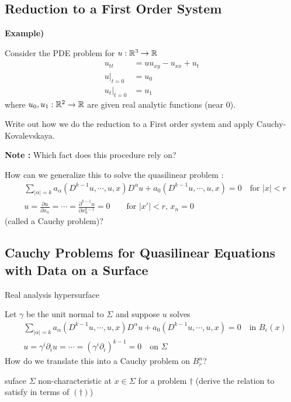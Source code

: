 \documentclass[10pt,a4paper]{report}
\newenvironment{proof}
{\begin{changemargin}{1cm}{0.5cm} 
	}%
	{\end{changemargin}
}
\begin{document}
\subsection*{Reduction to a First Order System}

\textbf{Example) }
\begin{proof}
\quad Consider the PDE problem for $u:\mathbb{R}^3 \rightarrow \mathbb{R}$
\begin{align}
u_{tt} &= uu_{xy} - u_{xx} + u_t  \label{11} \\
u\big|_{t=0}  &= u_0  \nonumber \\
u_t \big|_{t=0} &= u_1 \nonumber
\end{align}
where $u_0, u_1:\mathbb{R}^2 \rightarrow \mathbb{R}$ are given real analytic functions (near 0).

\quad Write out how we do the reduction to a First order system and apply Cauchy-Kovalevskaya.
\end{proof}
\s

\textbf{Note :} Which fact does this procedure rely on?
\s

How can we generalize this to solve the quasilinear problem :
\begin{align*}
& \sum_{|\alpha|=k} a_{\alpha} (D^{k-1}u,\cdots, u, x) D^{\alpha}u + a_0 (D^{k-1}u, \cdots, u,x) = 0 \quad \text{for } |x|<r \\
&  u = \frac{\partial u}{\partial x_n} =  \cdots = \frac{\partial^{k-1} u}{\partial x_n^{k-1}} = 0 \quad \quad \text{for } |x'| <r,\, x_n=0
\end{align*}
(called a Cauchy problem)?

\subsection*{Cauchy Problems for Quasilinear Equations with Data on a Surface}

Real analysis hypersurface
\s

Let $\gamma$ be the unit normal to $\Sigma$ and suppose $u$ solves
\begin{align}
& \sum_{|\alpha| =k} a_{\alpha}(D^{k-1}u, \cdots, u,x)D^{\alpha} u + a_0(D^{k-1}u, \cdots, u,x) =0 \quad \text{in } B_{\epsilon}(x) \label{dagger}\\
& u= \gamma^i \partial_i u = \cdots =(\gamma^i \partial_i)^{k-1} = 0 \quad \text{on } \Sigma \nonumber
\end{align}
How do we translate this into a Cauchy problem on $B_r^n$?
\s

 suface $\Sigma$ non-characteristic at $x\in \Sigma$ for a problem $\dagger$ (derive the relation to satisfy in terms of $(\dagger)$)
\s
\end{document}
